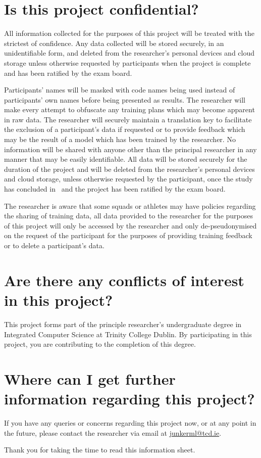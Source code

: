 \section*{Is this project confidential?}
All information collected for the purposes of this project will be treated with the strictest of confidence. Any data collected will be stored securely, in an unidentifiable form, and deleted from the researcher's personal devices and cloud storage unless otherwise requested by participants when the project is complete and has been ratified by the exam board.

Participants' names will be masked with code names being used instead of participants' own names before being presented as results. The researcher will make every attempt to obfuscate any training plans which may become apparent in raw data. The researcher will securely maintain a translation key to facilitate the exclusion of a participant's data if requested or to provide feedback which may be the result of a model which has been trained by the researcher. No information will be shared with anyone other than the principal researcher in any manner that may be easily identifiable. All data will be stored securely for the duration of the project and will be deleted from the researcher's personal devices and cloud storage, unless otherwise requested by the participant, once the study has concluded in \deadline~and the project has been ratified by the exam board.

The researcher is aware that some squads or athletes may have policies regarding the sharing of training data, all data provided to the researcher for the purposes of this project will only be accessed by the researcher and only de-pseudonymised on the request of the participant for the purposes of providing training feedback or to delete a participant's data.
\section*{Are there any conflicts of interest in this project?}
This project forms part of the principle researcher's undergraduate degree in Integrated Computer Science at Trinity College Dublin. By participating in this project, you are contributing to the completion of this degree.
\section*{Where can I get further information regarding this project?}
If you have any queries or concerns regarding this project now, or at any point in the future, please contact the researcher via email at \href{mailto:junkerml@tcd.ie}{junkerml@tcd.ie}.

\vspace{1cm}

Thank you for taking the time to read this information sheet.


